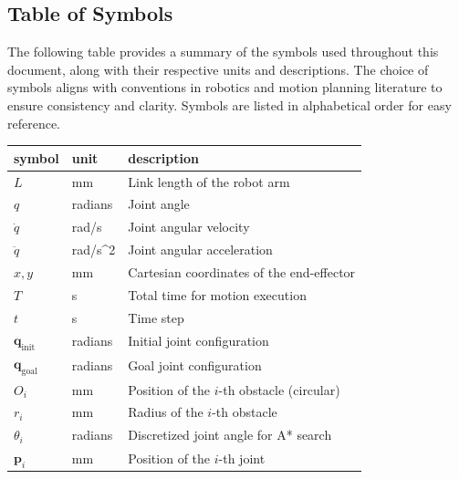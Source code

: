 \documentclass[12pt]{article}
\begin{document}
\subsection{Table of Symbols}

The following table provides a summary of the symbols used throughout this document, along with their respective units and descriptions. The choice of symbols aligns with conventions in robotics and motion planning literature to ensure consistency and clarity. Symbols are listed in alphabetical order for easy reference.

\renewcommand{\arraystretch}{1.2}
\noindent \begin{longtable*}{l l p{12cm}} \toprule
\textbf{symbol} & \textbf{unit} & \textbf{description}\\
\midrule 
\( L \) & \si{\milli\metre} & Link length of the robot arm \\
\( q \) & radians & Joint angle \\
\( \dot{q} \) & rad/s & Joint angular velocity \\
\( \ddot{q} \) & rad/s^2 & Joint angular acceleration \\
\( x, y \) & \si{\milli\metre} & Cartesian coordinates of the end-effector \\
\( T \) & \si{\second} & Total time for motion execution \\
\( t \) & \si{\second} & Time step \\
\( \mathbf{q}_{\text{init}} \) & radians & Initial joint configuration \\
\( \mathbf{q}_{\text{goal}} \) & radians & Goal joint configuration \\
\( O_i \) & \si{\milli\metre} & Position of the \(i\)-th obstacle (circular) \\
\( r_i \) & \si{\milli\metre} & Radius of the \(i\)-th obstacle \\
\( \theta_i \) & radians & Discretized joint angle for A* search \\
\( \mathbf{p}_i \) & \si{\milli\metre} & Position of the \(i\)-th joint \\

\bottomrule
\end{longtable*}
\end{document}
